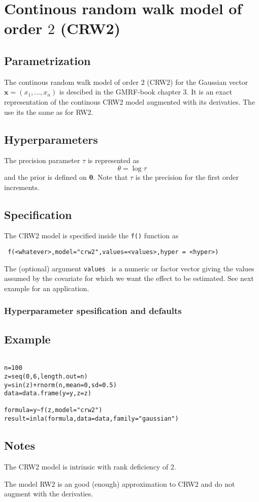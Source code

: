 \documentclass[a4paper,11pt]{article}
\begin{document}
\section*{Continous random walk model of order $2$ (CRW2)}

\subsection*{Parametrization}

The continous random walk model of order $2$ (CRW2) for the Gaussian
vector $\mathbf{x}=(x_1,\dots,x_n)$ is descibed in the GMRF-book
chapter 3. It is an exact representation of the continous CRW2 model
augmented with its derivaties. The use its the same as for RW2. 

\subsection*{Hyperparameters}

The precision parameter $\tau$ is represented as
\begin{displaymath}
    \theta =\log \tau
\end{displaymath}
and the prior is defined on $\mathbf{\theta}$. Note that $\tau$ is the
precision for the first order increments.

\subsection*{Specification}

The CRW2 model is specified inside the {\tt f()} function as
\begin{verbatim}
 f(<whatever>,model="crw2",values=<values>,hyper = <hyper>)
\end{verbatim}
The (optional) argument {\tt values } is a numeric or factor vector
giving the values assumed by the covariate for which we want the
effect to be estimated. See next example for an application.
 
\subsubsection*{Hyperparameter spesification and defaults}



\subsection*{Example}

\begin{verbatim}

n=100
z=seq(0,6,length.out=n)
y=sin(z)+rnorm(n,mean=0,sd=0.5)
data=data.frame(y=y,z=z)

formula=y~f(z,model="crw2")
result=inla(formula,data=data,family="gaussian")
\end{verbatim}


\subsection*{Notes}

The CRW2 model is intrinsic with rank deficiency of 2.

The model RW2 is an good (enough) approximation to CRW2 and do not
augment with the derivaties.
\end{document}
